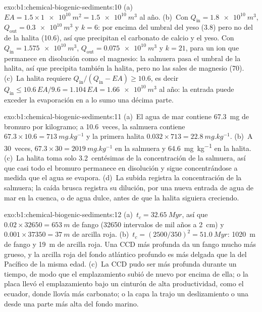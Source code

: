 \begin{solution}{exo:b1:chemical-biogenic-sediments:10}
(a)~$EA = 1.5\times\qty{1e10}{m^2} = \qty{1.5e10}{m^3}$ al año. (b)~Con
$Q_{\mathrm{in}} = \qty{1.8e10}{m^3}$, $Q_{\mathrm{out}} = \qty{0.3e10}{m^3}$ y
$k = 6$: por encima del umbral del yeso (3.8) pero no del de la halita (10.6), así que precipitan el carbonato de calcio y el yeso. Con $Q_{\mathrm{in}} =
\qty{1.575e10}{m^3}$, $Q_{\mathrm{out}} = \qty{0.075e10}{m^3}$ y $k = 21$, para un ion que permanece en disolución como el magnesio: la salmuera pasa el umbral de la halita, así que
precipita también la halita, pero no las sales de magnesio (70). (c)~La halita requiere $Q_{\mathrm{in}}/(Q_{\mathrm{in}} - EA) \ge 10.6$, es decir
$Q_{\mathrm{in}} \le 10.6\,EA/9.6 = 1.104\,EA = \qty{1.66e10}{m^3}$ al año: la entrada puede exceder la evaporación en a lo sumo una décima parte.
\end{solution}

\begin{solution}{exo:b1:chemical-biogenic-sediments:11}
(a)~El agua de mar contiene \qty{67.3}{mg} de bromuro por kilogramo; a 10.6~veces, la salmuera contiene $67.3\times10.6 = \qty{713}{mg.kg^{-1}}$ y la primera halita
$0.032\times713 = \qty{22.8}{mg.kg^{-1}}$. (b)~A 30~veces, $67.3\times30 =
\qty{2019}{mg.kg^{-1}}$ en la salmuera y \qty{64.6}{mg.kg^{-1}} en la halita. (c)~La halita toma solo 3.2~centésimas de la concentración de la salmuera, así que casi todo el bromuro
permanece en disolución y sigue concentrándose a medida que el agua se evapora. (d)~La subida registra la concentración de la salmuera; la caída brusca registra su dilución, por una nueva
entrada de agua de mar en la cuenca, o de agua dulce, antes de que la halita siguiera creciendo.
\end{solution}

\begin{solution}{exo:b1:chemical-biogenic-sediments:12}
(a)~$t_c = \qty{32.65}{Myr}$, así que $0.02\times\num{32650} = \qty{653}{m}$ de fango (\num{32650} intervalos de mil años a \qty{2}{cm}) y
$0.001\times\num{37350} = \qty{37}{m}$ de arcilla roja. (b)~$t_c = (2500/350)^2 =
\qty{51.0}{Myr}$: \qty{1020}{m} de fango y \qty{19}{m} de arcilla roja. Una CCD más profunda da un fango mucho más grueso, y la arcilla roja del fondo atlántico profundo es más
delgada que la del Pacífico de la misma edad. (c)~La CCD pudo ser más profunda durante un tiempo, de modo que el emplazamiento subió de nuevo por encima de ella; o la placa llevó el emplazamiento
bajo un cinturón de alta productividad, como el ecuador, donde llovía más carbonato; o la capa la trajo un deslizamiento o una  desde una parte más alta del fondo marino.
\end{solution}

